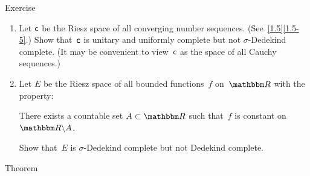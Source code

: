 \documentclass[main.tex]{subfiles}
\begin{document}
\begin{psec}{4.20}{Exercise}
\begin{enumerate}
\item \label{4.20-1}
Let $\mathsf{c}$ be the Riesz space of all converging number sequences.
(See~\ref{1.5}\ref{1.5-5}.)
Show that~$\mathsf{c}$ is unitary and uniformly complete
but not $\sigma$-Dedekind complete.
(It may be convenient to view~$\mathsf{c}$ as the space of all Cauchy sequences.)
%
\item \label{4.20-2}
Let $E$ be the Riesz space of all bounded functions~$f$ on~$\R$
with the property:
\begin{center}
\parbox{15em}{There exists a countable set $A\subset\R$
such that~$f$ is constant on $\R\backslash A$.}
\end{center}
Show that~$E$ is $\sigma$-Dedekind complete but not Dedekind complete.
\end{enumerate}
\end{psec}
%
%
\begin{psec}{4.21}{Theorem}\end{psec}
\end{document}
